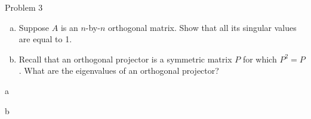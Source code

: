 \begin{section}{Problem 3}
    \begin{problem}{3}
        \begin{enumerate}[(a)]
            \item Suppose $A$ is an $n$-by-$n$ orthogonal matrix. Show that all its singular values are equal to 1.
            \item Recall that an orthogonal projector is a symmetric matrix $P$ for which $P^2=P$. What are the eigenvalues of an orthogonal projector?
        \end{enumerate}
    \end{problem}

    \begin{solution}{a}
    \end{solution}

    \newpage
    
    \begin{solution}{b}
    \end{solution}
\end{section}
